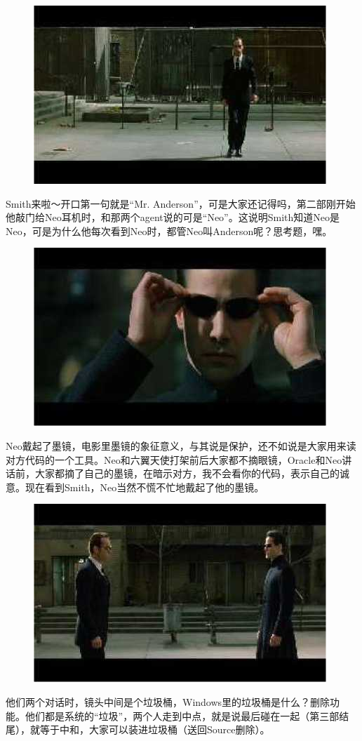 \documentclass{ctexart}
\begin{document}
\begin{figure}[htb]
\centering
\includegraphics[width=0.5\linewidth]{fig/read_reloaded-69}
\end{figure}

Smith来啦～开口第一句就是“Mr. Anderson”，可是大家还记得吗，第二部刚开始他敲门给Neo耳机时，和那两个agent说的可是“Neo”。这说明Smith知道Neo是Neo，可是为什么他每次看到Neo时，都管Neo叫Anderson呢？思考题，嘿。

\begin{figure}[htb]
\centering
\includegraphics[width=0.5\linewidth]{fig/read_reloaded-70}
\end{figure}

Neo戴起了墨镜，电影里墨镜的象征意义，与其说是保护，还不如说是大家用来读对方代码的一个工具。Neo和六翼天使打架前后大家都不摘眼镜，Oracle和Neo讲话前，大家都摘了自己的墨镜，在暗示对方，我不会看你的代码，表示自己的诚意。现在看到Smith，Neo当然不慌不忙地戴起了他的墨镜。

\begin{figure}[htb]
\centering
\includegraphics[width=0.5\linewidth]{fig/read_reloaded-71}
\end{figure}

他们两个对话时，镜头中间是个垃圾桶，Windows里的垃圾桶是什么？删除功能。他们都是系统的“垃圾”，两个人走到中点，就是说最后碰在一起（第三部结尾），就等于中和，大家可以装进垃圾桶（送回Source删除）。
\end{document}
